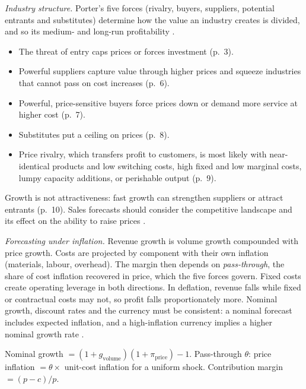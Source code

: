 \begin{qfmethod}\label{meth:competition-inflation-forecasting}
 \emph{Industry structure.} Porter's five forces (rivalry, buyers, suppliers, potential entrants and substitutes) determine how the value an industry creates is divided, and so its medium- and long-run profitability \citep[pp.~2--3, 10]{five-competitive-forces-2008}.
\begin{itemize}
\item The threat of entry caps prices or forces investment (p.~3).
\item Powerful suppliers capture value through higher prices and squeeze industries that cannot pass on cost increases (p.~6).
\item Powerful, price-sensitive buyers force prices down or demand more service at higher cost (p.~7).
\item Substitutes put a ceiling on prices (p.~8).
\item Price rivalry, which transfers profit to customers, is most likely with near-identical products and low switching costs, high fixed and low marginal costs, lumpy capacity additions, or perishable output (p.~9).
\end{itemize}
Growth is not attractiveness: fast growth can strengthen suppliers or attract entrants (p.~10). Sales forecasts should consider the competitive landscape and its effect on the ability to raise prices \citep[pp.~492--493]{financial-statement-analysis-2009}.

\emph{Forecasting under inflation.} Revenue growth is volume growth compounded with price growth. Costs are projected by component with their own inflation (materials, labour, overhead). The margin then depends on \emph{pass-through}, the share of cost inflation recovered in price, which the five forces govern. Fixed costs create operating leverage in both directions. In deflation, revenue falls while fixed or contractual costs may not, so profit falls proportionately more. Nominal growth, discount rates and the currency must be consistent: a nominal forecast includes expected inflation, and a high-inflation currency implies a higher nominal growth rate \citep[p.~307]{investment-valuation-2012}.

 Nominal growth $=(1+g_{\text{volume}})(1+\pi_{\text{price}})-1$. Pass-through $\theta$: price inflation $=\theta\times$ unit-cost inflation for a uniform shock. Contribution margin $=(p-c)/p$.


\end{qfmethod}
